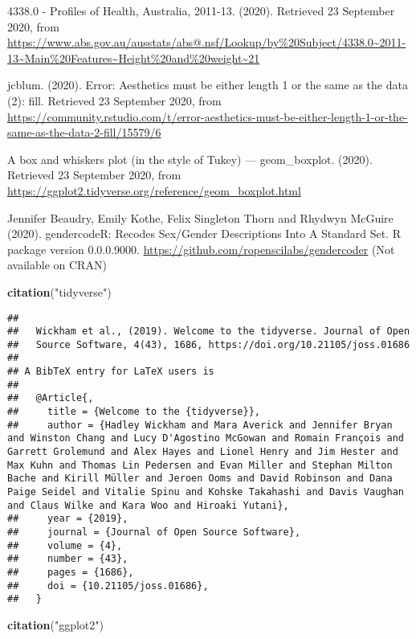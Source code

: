 \documentclass[
]{article}
\newenvironment{Shaded}{\begin{snugshade}}{\end{snugshade}}
\newcommand{\KeywordTok}[1]{\textcolor[rgb]{0.13,0.29,0.53}{\textbf{#1}}}
\newcommand{\NormalTok}[1]{#1}
\newcommand{\StringTok}[1]{\textcolor[rgb]{0.31,0.60,0.02}{#1}}
\begin{document}
4338.0 - Profiles of Health, Australia, 2011-13. (2020). Retrieved 23
September 2020, from
\url{https://www.abs.gov.au/ausstats/abs@.nsf/Lookup/by\%20Subject/4338.0~2011-13~Main\%20Features~Height\%20and\%20weight~21}

jcblum. (2020). Error: Aesthetics must be either length 1 or the same as
the data (2): fill. Retrieved 23 September 2020, from
\url{https://community.rstudio.com/t/error-aesthetics-must-be-either-length-1-or-the-same-as-the-data-2-fill/15579/6}

A box and whiskers plot (in the style of Tukey) --- geom\_boxplot.
(2020). Retrieved 23 September 2020, from
\url{https://ggplot2.tidyverse.org/reference/geom_boxplot.html}

Jennifer Beaudry, Emily Kothe, Felix Singleton Thorn and Rhydwyn McGuire
(2020). gendercodeR: Recodes Sex/Gender Descriptions Into A Standard
Set. R package version 0.0.0.9000.
\url{https://github.com/ropenscilabs/gendercoder} (Not available on
CRAN)

\begin{Shaded}
\begin{Highlighting}[]
\KeywordTok{citation}\NormalTok{(}\StringTok{"tidyverse"}\NormalTok{)}
\end{Highlighting}
\end{Shaded}

\begin{verbatim}
## 
##   Wickham et al., (2019). Welcome to the tidyverse. Journal of Open
##   Source Software, 4(43), 1686, https://doi.org/10.21105/joss.01686
## 
## A BibTeX entry for LaTeX users is
## 
##   @Article{,
##     title = {Welcome to the {tidyverse}},
##     author = {Hadley Wickham and Mara Averick and Jennifer Bryan and Winston Chang and Lucy D'Agostino McGowan and Romain François and Garrett Grolemund and Alex Hayes and Lionel Henry and Jim Hester and Max Kuhn and Thomas Lin Pedersen and Evan Miller and Stephan Milton Bache and Kirill Müller and Jeroen Ooms and David Robinson and Dana Paige Seidel and Vitalie Spinu and Kohske Takahashi and Davis Vaughan and Claus Wilke and Kara Woo and Hiroaki Yutani},
##     year = {2019},
##     journal = {Journal of Open Source Software},
##     volume = {4},
##     number = {43},
##     pages = {1686},
##     doi = {10.21105/joss.01686},
##   }
\end{verbatim}

\begin{Shaded}
\begin{Highlighting}[]
\KeywordTok{citation}\NormalTok{(}\StringTok{"ggplot2"}\NormalTok{)}
\end{Highlighting}
\end{Shaded}
\end{document}

